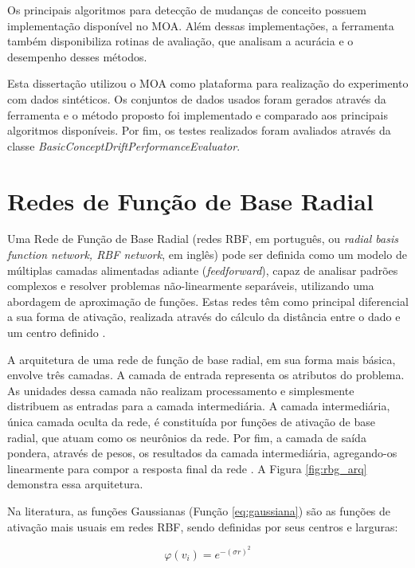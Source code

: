\documentclass[msc, classic, a4paper]{ufbathesis}
\begin{document}
Os principais algoritmos para detecção de mudanças de conceito possuem implementação disponível no MOA.
Além dessas implementações, a ferramenta também disponibiliza rotinas de avaliação, que analisam a acurácia e o desempenho desses métodos.

Esta dissertação utilizou o MOA como plataforma para realização do experimento com dados sintéticos.
Os conjuntos de dados usados foram gerados através da ferramenta e o método proposto foi implementado e comparado aos principais algoritmos disponíveis. 
Por fim, os testes realizados foram avaliados através da classe \textit{BasicConceptDriftPerformanceEvaluator}.

\section{Redes de Função de Base Radial}
\label{sec:rbf}

Uma Rede de Função de Base Radial (redes RBF, em português,  ou \textit{radial basis function network, RBF network}, em inglês) pode ser definida como um modelo de múltiplas camadas alimentadas adiante (\textit{feedforward}),
capaz de analisar padrões complexos e resolver problemas não-linearmente separáveis, utilizando uma abordagem de aproximação de funções.
Estas redes têm como principal diferencial a sua forma de ativação, realizada através do cálculo da distância entre o dado e um centro definido \cite{Braga:RedesNeuraisTeoriaAplicacoes}.

A arquitetura de uma rede de função de base radial, em sua forma mais básica, envolve três camadas.
A camada de entrada representa os atributos do problema. As unidades dessa camada não realizam processamento e simplesmente distribuem as entradas para a camada intermediária.
A camada intermediária, única camada oculta da rede, é constituída por funções de ativação de base radial, que atuam como os neurônios da rede.
Por fim, a camada de saída pondera, através de pesos, os resultados da camada intermediária, agregando-os linearmente para compor a resposta final da rede \cite{Rojas:1996:NNS:235222}.
A Figura \ref{fig:rbg_arq} demonstra essa arquitetura.

Na literatura, as funções Gaussianas (Função \ref{eq:gaussiana}) são as funções de ativação mais usuais em redes RBF, sendo definidas por seus centros e larguras:

\begin{equation}
    \label{eq:gaussiana}
    \varphi (v_{i})=e^{-(\sigma r)^{2}}
\end{equation}
\end{document}
